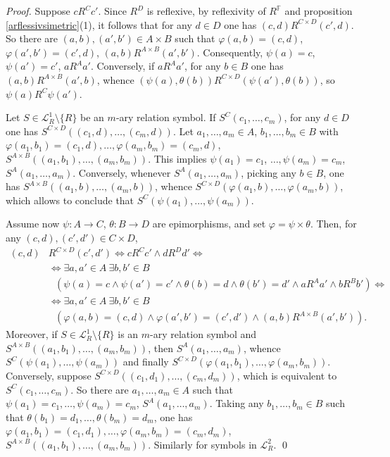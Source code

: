 \documentclass[12pt,twoside,a4paper]{amsart}
\theoremstyle{plain}
\theoremstyle{definition}
\begin{document}
\begin{proof}
Suppose $cR^Cc'$.
Since $R^D$ is reflexive, by reflexivity of $R^{ \mathbb F}$ and proposition \ref{arflessivsimetric}(1), it follows that for any $d\in D$ one has $(c,d)R^{C\times D}(c',d)$.
So there are $(a,b),(a',b')\in A\times B$ such that $ {\varphi} (a,b)=(c,d)$, $ {\varphi} (a',b')=(c',d)$, $(a,b)R^{A\times B}(a',b')$.
Consequently, $\psi (a)=c$, $\psi (a')=c'$, $aR^Aa'$.
Conversely, if $aR^Aa'$, for any $b\in B$ one has $(a,b)R^{A\times B}(a',b)$, whence $(\psi (a),\theta (b))R^{C\times D}(\psi (a'),\theta (b))$, so $\psi(a)R^C\psi (a')$.

Let $S\in \mathcal L_R^1\setminus\{ R\} $ be an $m$-ary relation symbol.
If $S^C(c_1,\ldots ,c_m)$, for any $d\in D$ one has $S^{C\times D}((c_1,d),\ldots ,(c_m,d))$.
Let $a_1,\ldots ,a_m\in A$, $b_1,\ldots ,b_m\in B$ with $ {\varphi} (a_1,b_1)=(c_1,d),\ldots , {\varphi} (a_m,b_m)=(c_m,d)$, $S^{A\times B}((a_1,b_1),\ldots ,(a_m,b_m))$.
This implies $\psi (a_1)=c_1$, $\ldots ,\psi (a_m)=c_m$, $S^A(a_1,\ldots ,a_m)$.
Conversely, whenever $S^A(a_1,\ldots ,a_m)$, picking any $b\in B$, one has $S^{A\times B}((a_1,b),\ldots ,(a_m,b))$, whence $S^{C\times D}( {\varphi} (a_1,b),\ldots , {\varphi} (a_m,b))$, which allows to conclude that $S^C(\psi (a_1),\ldots ,\psi (a_m))$.

Assume now $\psi :A\to C$, $\theta :B\to D$ are epimorphisms, and set $ {\varphi} =\psi\times \theta $.
Then, for any $(c,d),(c',d')\in C\times D$,
\[
\begin{split}
(c,d) & R^{C\times D}(c',d')\Leftrightarrow cR^Cc'\wedge dR^Dd'\Leftrightarrow \\
 & \Leftrightarrow\exists a,a'\in A\ \exists b,b'\in B \\
 & \ \ \ (\psi (a)=c\wedge\psi (a')=c'\wedge\theta (b)=d\wedge\theta (b')=d'\wedge aR^Aa'\wedge bR^Bb')\Leftrightarrow \\
 & \Leftrightarrow\exists a,a'\in A\ \exists b,b'\in B \\
 & \ \ \ ( {\varphi} (a,b)=(c,d)\wedge {\varphi} (a',b')=(c',d')\wedge (a,b)R^{A\times B}(a',b')).
\end{split}
\]
Moreover, if $S\in \mathcal L_R^1\setminus\{ R\} $ is an $m$-ary relation symbol and $S^{A\times B}((a_1,b_1),\ldots ,(a_m,b_m))$, then $S^A(a_1,\ldots ,a_m)$, whence $S^C(\psi (a_1),\ldots ,\psi (a_m))$ and finally $S^{C\times D}( {\varphi} (a_1,b_1),\ldots , {\varphi} (a_m,b_m))$.
Conversely, suppose $S^{C\times D}((c_1,d_1),\ldots ,(c_m,d_m))$, which is equivalent to $S^C(c_1,\ldots ,c_m)$.
So there are $a_1,\ldots ,a_m\in A$ such that $\psi (a_1)=c_1,\ldots ,\psi (a_m)=c_m$, $S^A(a_1,\ldots ,a_m)$.
Taking any $b_1,\ldots ,b_m\in B$ such that $\theta (b_1)=d_1,\ldots ,\theta (b_m)=d_m$, one has $ {\varphi} (a_1,b_1)=(c_1,d_1),\ldots , {\varphi} (a_m,b_m)=(c_m,d_m)$, $S^{A\times B}((a_1,b_1),\ldots ,(a_m,b_m))$.
Similarly for symbols in $ \mathcal L_R^2$.
\qed


\end{proof}
\end{document}
